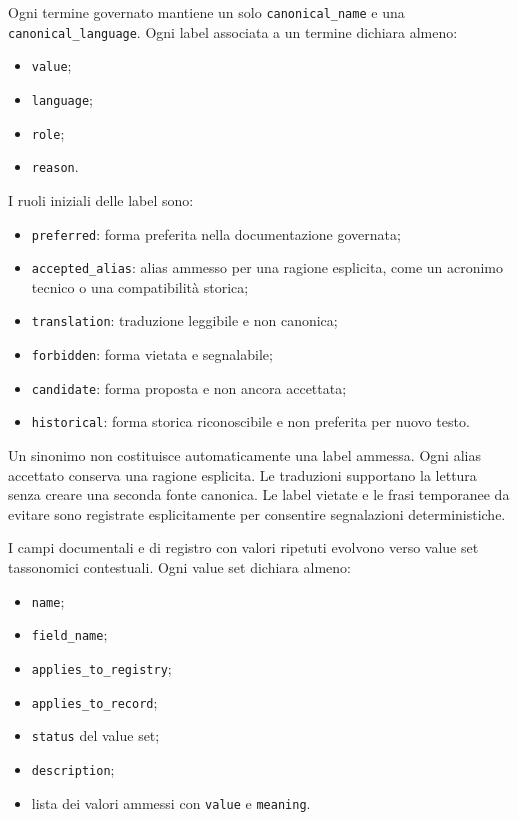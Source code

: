 \documentclass[
  10pt,
]{article}
\providecommand{\tightlist}{%
  \setlength{\itemsep}{0pt}\setlength{\parskip}{0pt}}
\begin{document}
Ogni termine governato mantiene un solo \texttt{canonical\_name} e una
\texttt{canonical\_language}. Ogni label associata a un termine dichiara
almeno:

\begin{itemize}
\tightlist
\item
  \texttt{value};
\item
  \texttt{language};
\item
  \texttt{role};
\item
  \texttt{reason}.
\end{itemize}

I ruoli iniziali delle label sono:

\begin{itemize}
\tightlist
\item
  \texttt{preferred}: forma preferita nella documentazione governata;
\item
  \texttt{accepted\_alias}: alias ammesso per una ragione esplicita,
  come un acronimo tecnico o una compatibilità storica;
\item
  \texttt{translation}: traduzione leggibile e non canonica;
\item
  \texttt{forbidden}: forma vietata e segnalabile;
\item
  \texttt{candidate}: forma proposta e non ancora accettata;
\item
  \texttt{historical}: forma storica riconoscibile e non preferita per
  nuovo testo.
\end{itemize}

Un sinonimo non costituisce automaticamente una label ammessa. Ogni
alias accettato conserva una ragione esplicita. Le traduzioni supportano
la lettura senza creare una seconda fonte canonica. Le label vietate e
le frasi temporanee da evitare sono registrate esplicitamente per
consentire segnalazioni deterministiche.

I campi documentali e di registro con valori ripetuti evolvono verso
value set tassonomici contestuali. Ogni value set dichiara almeno:

\begin{itemize}
\tightlist
\item
  \texttt{name};
\item
  \texttt{field\_name};
\item
  \texttt{applies\_to\_registry};
\item
  \texttt{applies\_to\_record};
\item
  \texttt{status} del value set;
\item
  \texttt{description};
\item
  lista dei valori ammessi con \texttt{value} e \texttt{meaning}.
\end{itemize}
\end{document}
